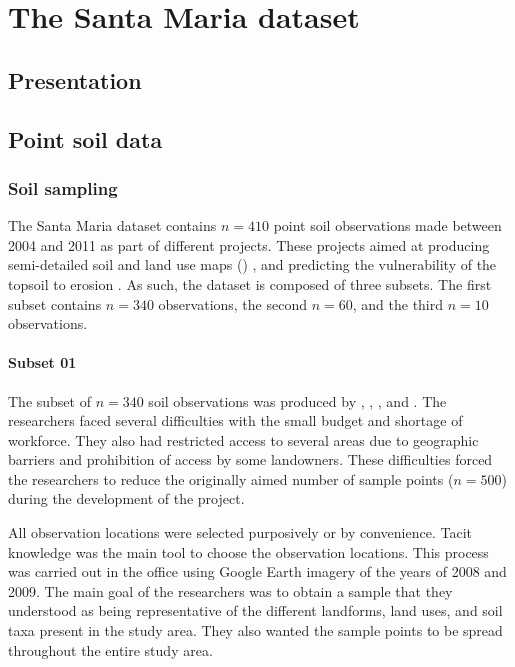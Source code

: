 \artigofalse
\chapter{The Santa Maria dataset}
\label{apen:database}

\tocless\section{Presentation}


\tocless\section{Point soil data}

\tocless\subsection{Soil sampling}

The Santa Maria dataset contains $n = 410$ point soil observations made between 2004 and 2011 as part of
different projects. These projects aimed at producing semi-detailed soil and land use maps ()
\cite{Pedron2005,Miguel2010,SamuelRosaEtAl2011a, MiguelEtAl2012}, and predicting the vulnerability of
the topsoil to erosion \cite{MouraBueno2012, Miguel2013}. As such, the dataset is composed of three
subsets. The first subset contains $n = 340$ observations, the second $n = 60$, and the third $n = 10$
observations.

\tocless\subsubsection{Subset 01}

The subset of $n = 340$ soil observations was produced by , 
, , and . The researchers 
faced several difficulties with the small budget and shortage of workforce. They also had restricted 
access to several areas due to geographic barriers and prohibition of access by some landowners.
These difficulties forced the researchers to reduce the originally aimed number of sample points 
($n = 500$) during the development of the project.

All observation locations were selected purposively or by convenience. Tacit knowledge was the main tool
to choose the observation locations. This process was carried out in the office using 
Google Earth\textregistered{} imagery of the years of 2008 and 2009. The main goal of the researchers was 
to obtain a sample that they
understood as being representative of the different landforms, land uses, and soil taxa present in the 
study area. They also wanted the sample points to be spread throughout the entire study area.

